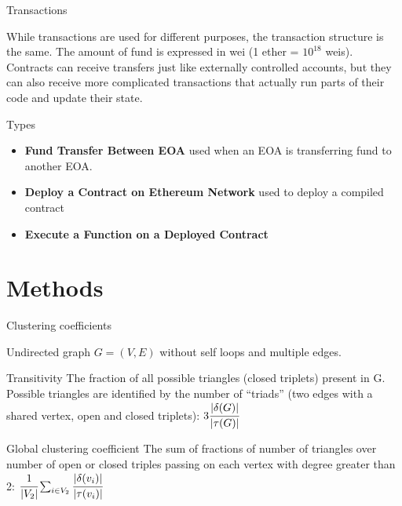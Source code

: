 \documentclass{beamer}
\begin{document}
    \begin{frame}{Transactions}
        \begin{block}{}
            While transactions are used for different purposes, the transaction structure is the same.
            The amount of fund is expressed in wei (1 ether = $10^{18}$ weis).
            Contracts can receive transfers just like externally controlled accounts, but they can also receive more complicated transactions that actually run parts of their code and update their state.
        \end{block}

        \vskip 0.5cm

        \begin{block}{Types}
            \begin{itemize}
                \item \textbf{Fund Transfer Between EOA} used when an EOA is transferring fund to another EOA\@.
                \item \textbf{Deploy a Contract on Ethereum Network} used to deploy a compiled contract
                \item \textbf{Execute a Function on a Deployed Contract}
            \end{itemize}
        \end{block}
    \end{frame}

    \section{Methods}\label{sec:methods}

    \begin{frame}{Clustering coefficients}
        \begin{block}{}
            Undirected graph $G = (V,E)$ without self loops and multiple edges.
        \end{block}

        \vskip 0.5cm

        \begin{block}{Transitivity}
            The fraction of all possible triangles (closed triplets) present in G. Possible triangles are identified by the number of “triads” (two edges with a shared vertex, open and closed triplets): $3\cfrac{|\delta(G)|}{|\tau(G)|}$
        \end{block}

        \begin{block}{Global clustering coefficient}
            The sum of fractions of number of triangles over number of open or closed triples passing on each vertex with degree greater than 2:
            $\cfrac{1}{|V_2|} \sum_{i \in V_2}\cfrac{|\delta(v_i)|}{|\tau(v_i)|}$
        \end{block}
    \end{frame}
\end{document}
